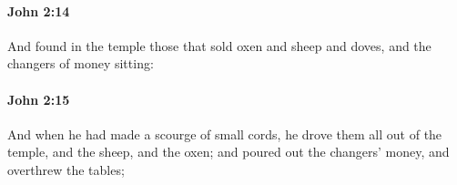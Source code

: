 		\paragraph{John 2:14} %
			\label{JOHN-2-14}

			And found in the temple those that sold oxen and sheep and doves, and the changers of money sitting:

			\begin{framed}
			\scriptsize
				\begin{compactdesc}
					\item[SBLG] 
				\end{compactdesc}
			\end{framed}

		\paragraph{John 2:15} %
			\label{JOHN-2-15}

			And when he had made a scourge of small cords, he drove them all out of the temple, and the sheep, and the oxen; and poured out the changers' money, and overthrew the tables;

